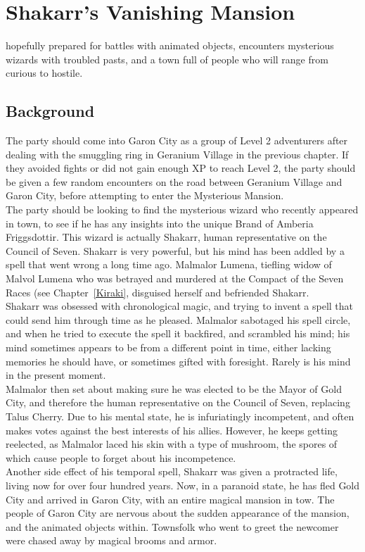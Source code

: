 \chapter{Shakarr's Vanishing Mansion}
 hopefully prepared for battles with animated objects, encounters mysterious wizards with troubled pasts, and a town full of people who will range from curious to hostile. 
\section{Background}
The party should come into Garon City as a group of Level 2 adventurers after dealing with the smuggling ring in Geranium Village in the previous chapter. If they avoided fights or did not gain enough XP to reach Level 2, the party should be given a few random encounters on the road between Geranium Village and Garon City, before attempting to enter the Mysterious Mansion.\\
The party should be looking to find the mysterious wizard who recently appeared in town, to see if he has any insights into the unique Brand of Amberia Friggsdottir. This wizard is actually Shakarr, human representative on the Council of Seven. Shakarr is very powerful, but his mind has been addled by a spell that went wrong a long time ago. Malmalor Lumena, tiefling widow of Malvol Lumena who was betrayed and murdered at the Compact of the Seven Races (see Chapter~\ref{Kiraki}, disguised herself and befriended Shakarr.\\
Shakarr was obsessed with chronological magic, and trying to invent a spell that could send him through time as he pleased. Malmalor sabotaged his spell circle, and when he tried to execute the spell it backfired, and scrambled his mind; his mind sometimes appears to be from a different point in time, either lacking memories he should have, or sometimes gifted with foresight. Rarely is his mind in the present moment. \\
Malmalor then set about making sure he was elected to be the Mayor of Gold City, and therefore the human representative on the Council of Seven, replacing Talus Cherry. Due to his mental state, he is infuriatingly incompetent, and often makes votes against the best interests of his allies. However, he keeps getting reelected, as Malmalor laced his skin with a type of mushroom, the spores of which cause people to forget about his incompetence.\\
Another side effect of his temporal spell, Shakarr was given a protracted life, living now for over four hundred years. Now, in a paranoid state, he has fled Gold City and arrived in Garon City, with an entire magical mansion in tow. The people of Garon City are nervous about the sudden appearance of the mansion, and the animated objects within. Townsfolk who went to greet the newcomer were chased away by magical brooms and armor.
